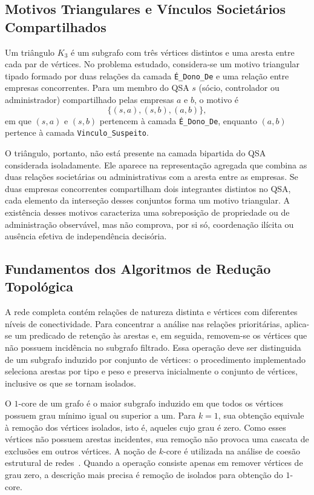 \subsection{Motivos Triangulares e Vínculos Societários Compartilhados}

Um triângulo $K_3$ é um subgrafo com três vértices distintos e uma aresta entre cada par de vértices. No problema estudado, considera-se um motivo triangular tipado formado por duas relações da camada \texttt{É\_Dono\_De} e uma relação entre empresas concorrentes. Para um membro do QSA $s$ (sócio, controlador ou administrador) compartilhado pelas empresas $a$ e $b$, o motivo é
\begin{equation}
  \{(s,a),(s,b),(a,b)\},
  \label{eq:motivo_triangular}
\end{equation}
em que $(s,a)$ e $(s,b)$ pertencem à camada \texttt{É\_Dono\_De}, enquanto $(a,b)$ pertence à camada \texttt{Vinculo\_Suspeito}.

O triângulo, portanto, não está presente na camada bipartida do QSA considerada isoladamente. Ele aparece na representação agregada que combina as duas relações societárias ou administrativas com a aresta entre as empresas. Se duas empresas concorrentes compartilham dois integrantes distintos no QSA, cada elemento da interseção desses conjuntos forma um motivo triangular. A existência desses motivos caracteriza uma sobreposição de propriedade ou de administração observável, mas não comprova, por si só, coordenação ilícita ou ausência efetiva de independência decisória.

\subsection{Fundamentos dos Algoritmos de Redução Topológica}

A rede completa contém relações de natureza distinta e vértices com diferentes níveis de conectividade. Para concentrar a análise nas relações prioritárias, aplica-se um predicado de retenção às arestas e, em seguida, removem-se os vértices que não possuem incidência no subgrafo filtrado. Essa operação deve ser distinguida de um subgrafo induzido por conjunto de vértices: o procedimento implementado seleciona arestas por tipo e peso e preserva inicialmente o conjunto de vértices, inclusive os que se tornam isolados.

O $1$-core de um grafo é o maior subgrafo induzido em que todos os vértices possuem grau mínimo igual ou superior a um. Para $k=1$, sua obtenção equivale à remoção dos vértices isolados, isto é, aqueles cujo grau é zero. Como esses vértices não possuem arestas incidentes, sua remoção não provoca uma cascata de exclusões em outros vértices. A noção de $k$-core é utilizada na análise de coesão estrutural de redes~\cite{seidman1983network}. Quando a operação consiste apenas em remover vértices de grau zero, a descrição mais precisa é remoção de isolados para obtenção do $1$-core.

